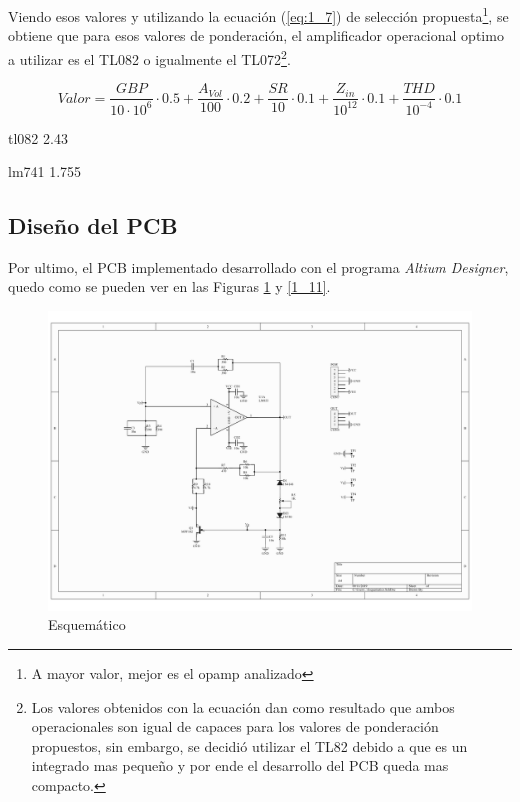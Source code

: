 Viendo esos valores y utilizando la ecuación (\ref{eq:1_7}) de selección
propuesta\footnote{A mayor valor, mejor es el opamp analizado}, se
obtiene que para esos valores de ponderación, el amplificador operacional
optimo a utilizar es el TL082 o igualmente el TL072\footnote{Los valores obtenidos con la ecuación dan como resultado que ambos
operacionales son igual de capaces para los valores de ponderación
propuestos, sin embargo, se decidió utilizar el TL82 debido a que
es un integrado mas pequeño y por ende el desarrollo del PCB queda
mas compacto.}.

\begin{equation}
Valor=\frac{GBP}{10\cdot10^{6}}\cdot0.5+\frac{A_{Vol}}{100}\cdot0.2+\frac{SR}{10}\cdot0.1+\frac{Z_{in}}{10^{12}}\cdot0.1+\frac{THD}{10^{-4}}\cdot0.1\label{eq:1_7}
\end{equation}

tl082 2.43

lm741 1.755

\subsection{Diseño del PCB}

Por ultimo, el PCB implementado desarrollado con el programa \emph{Altium
Designer}, quedo como se pueden ver en las Figuras \ref{1_10} y \ref{1_11}.

\begin{figure}[h]
\begin{centering}
\includegraphics[scale=0.5]{../Ex1/Resources/Esquematico}
\par\end{centering}
\caption{Esquemático}

\label{1_10}
\end{figure}

